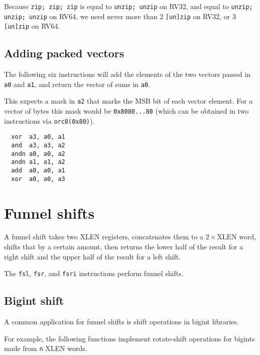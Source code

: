 Because {\tt zip; zip; zip} is equal to {\tt unzip; unzip} on RV32,
and equal to {\tt unzip; unzip; unzip} on RV64, we need never more
than 2 {\tt [un]zip} on RV32, or 3 {\tt [un]zip} on RV64.


\subsection{Adding packed vectors}

The following six instructions will add the elements of the two vectors passed
in {\tt a0} and {\tt a1}, and return the vector of sums in {\tt a0}.

This expects a mask in {\tt a2} that marks the MSB bit of each vector
element. For a vector of bytes this mask would be {\tt 0x8080...80} (which
can be obtained in two instructions via {\tt orc8(0x80)}).

\begin{minipage}{\linewidth}
\begin{verbatim}
  xor  a3, a0, a1
  and  a3, a3, a2
  andn a0, a0, a2
  andn a1, a1, a2
  add  a0, a0, a1
  xor  a0, a0, a3
\end{verbatim}
\end{minipage}


\section{Funnel shifts}
\label{funnel}

A funnel shift takes two XLEN registers, concatenates them to a $2 \times
\textrm{XLEN}$ word, shifts that by a certain amount, then returns the lower
half of the result for a right shift and the upper half of the result for a
left shift.

The {\tt fsl}, {\tt fsr}, and {\tt fsri} instructions perform funnel shifts.

\subsection{Bigint shift}

A common application for funnel shifts is shift operations in bigint libraries.

For example, the following functions implement rotate-shift operations
for bigints made from {\tt n} XLEN words.

